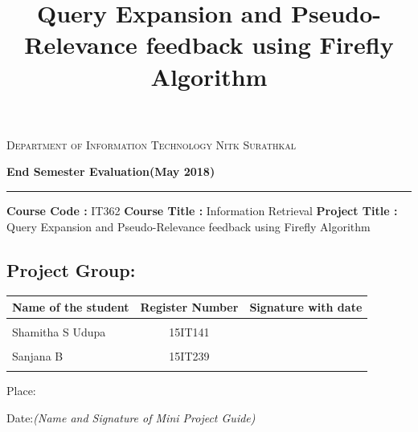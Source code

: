 \documentclass{nitk}
\title{Query Expansion and Pseudo-Relevance feedback using Firefly Algorithm} %
\author{
    \textrm{15IT141 Shamitha S Udupa \and \vspace{-0.25cm}
   	15IT239 Sanjana B}
}
\begin{document}
    \maketitle
    \newpage
    \begin{center}
    \textsc{\Large{Department of Information Technology}}
    \textsc{\Large{Nitk Surathkal}}
    
    \vspace{5mm}
    \textbf{\large{End Semester Evaluation(May 2018)}}
    \noindent\rule{16cm}{0.2pt}
    \end{center}

	
    \noindent
    \textbf{Course Code : } IT362
    \textbf{Course Title : } Information Retrieval
    \textbf{Project Title : } Query Expansion and Pseudo-Relevance feedback using Firefly Algorithm
    \subsection*{Project Group:}
    \begin{tabular}{lcl}
    \hline
    Name of the student &Register Number &Signature with date \\
    \hline
    \\
    Shamitha S Udupa &15IT141 &  \\\\
    Sanjana B &15IT239	& 
    \\\\
    \hline
    \end{tabular}
    \vspace{5 em}

    Place:

    Date:\hfill \textit{(Name and Signature of Mini Project Guide)}
	
\end{document}
